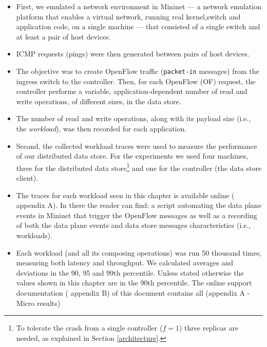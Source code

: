 \begin{itemize}

\item First, we emulated a network environment in Mininet  --- a network
emulation platform that enables a virtual network, running real
kernel,switch and application code, on a single machine
\cite{Handigol:2012t} ---  that consisted of a single switch and at
least a pair of host devices.

\item ICMP requests (pings) were then generated between pairs of host
  devices.

\item The objective was to create OpenFlow  traffic (\texttt{packet-in} messages) from the ingress switch to the controller.
Then, for each OpenFlow (OF) request, the controller performs a variable, application-dependent number of read and write operations, of different sizes, in the data store.
\item The number of read and write operations, along with its payload size (i.e., the \textit{workload}), was then recorded for each application.

\item Second, the collected workload traces were used to measure the performance of our distributed data store.
For the experiments we used four machines, three for the distributed
data store\footnote{To tolerate the crash from a single controller
  ($f=1$) three replicas are needed, as explained in Section
  \ref{architecture}.} and one for the controller (the data store
client).

\item The traces for each workload seen in this chapter is available online (\cite{support} appendix
  A). In there the reader can find: a script automating the data plane
  events in Mininet that trigger the OpenFlow messages as well as a recording of
  both the data plane events and data store messages characteristics
  (i.e., workloads).  


\item Each workload (and all its composing operations)  was run 50 thousand
times, measuring both latency and throughput. We calculated averages
and deviations in the 90, 95 and 99th percentile. Unless stated
otherwise the values shown in this chapter are in the 90th
percentile. The online support documentation (\cite{support}  appendix
B) of this document contains all (appendix  A - Micro results)


\end{itemize}

